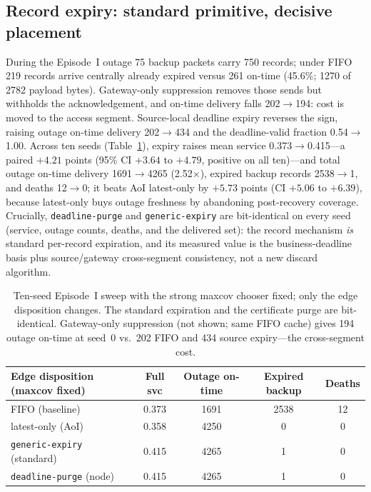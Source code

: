 \documentclass[11pt]{article}
\begin{document}
\subsection{Record expiry: standard primitive, decisive placement}
\label{sec:eval-record}
During the Episode~I outage 75 backup packets carry 750 records; under FIFO 219 records arrive
centrally already expired versus 261 on-time (45.6\%; 1270 of 2782 payload bytes). Gateway-only
suppression removes those sends but withholds the acknowledgement, and on-time delivery falls
202$\to$194: cost is moved to the access segment. Source-local deadline expiry reverses the sign,
raising outage on-time delivery 202$\to$434 and the deadline-valid fraction 0.54$\to$1.00. Across
ten seeds (Table~\ref{tab:purgeexpiry}), expiry raises mean service 0.373$\to$0.415---a paired
$+4.21$ points (95\% CI $+3.64$ to $+4.79$, positive on all ten)---and total outage on-time
delivery 1691$\to$4265 (2.52$\times$), expired backup records 2538$\to$1, and deaths 12$\to$0; it
beats AoI latest-only by $+5.73$ points (CI $+5.06$ to $+6.39$), because latest-only buys outage
freshness by abandoning post-recovery coverage. Crucially, \texttt{deadline-purge} and
\texttt{generic-expiry} are bit-identical on every seed (service, outage counts, deaths, and the
delivered set): the record mechanism \emph{is} standard per-record expiration, and its measured
value is the business-deadline basis plus source/gateway cross-segment consistency, not a new
discard algorithm.

\begin{table}[h]
\centering\small
\begin{tabular}{lcccc}
\toprule
Edge disposition (maxcov fixed) & Full svc & Outage on-time & Expired backup & Deaths\\
\midrule
FIFO (baseline) & 0.373 & 1691 & 2538 & 12\\
latest-only (AoI) & 0.358 & 4250 & 0 & 0\\
\texttt{generic-expiry} (standard) & 0.415 & 4265 & 1 & 0\\
\texttt{deadline-purge} (node) & 0.415 & 4265 & 1 & 0\\
\bottomrule
\end{tabular}
\caption{Ten-seed Episode~I sweep with the strong maxcov chooser fixed; only the edge disposition
changes. The standard expiration and the certificate purge are bit-identical. Gateway-only
suppression (not shown; same FIFO cache) gives 194 outage on-time at seed~0 vs.\ 202 FIFO and 434
source expiry---the cross-segment cost.}
\label{tab:purgeexpiry}
\end{table}
\end{document}
